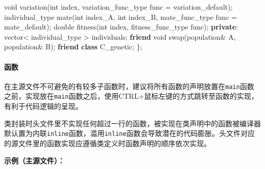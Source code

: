 \documentclass[
]{article}
\newenvironment{Shaded}{}{}
\newcommand{\DataTypeTok}[1]{\textcolor[rgb]{0.56,0.13,0.00}{#1}}
\newcommand{\KeywordTok}[1]{\textcolor[rgb]{0.00,0.44,0.13}{\textbf{#1}}}
\newcommand{\NormalTok}[1]{#1}
\newcommand{\OperatorTok}[1]{\textcolor[rgb]{0.40,0.40,0.40}{#1}}
\begin{document}
\begin{Shaded}
\begin{Highlighting}[]
	\DataTypeTok{void}\NormalTok{ variation}\OperatorTok{(}\DataTypeTok{int}\NormalTok{ index}\OperatorTok{,} \DataTypeTok{variation\_func\_type}\NormalTok{ func }\OperatorTok{=}\NormalTok{ variation\_default}\OperatorTok{);}
	\DataTypeTok{individual\_type}\NormalTok{ mate}\OperatorTok{(}\DataTypeTok{int}\NormalTok{ index\_A}\OperatorTok{,} \DataTypeTok{int}\NormalTok{ index\_B}\OperatorTok{,} \DataTypeTok{mate\_func\_type}\NormalTok{ func }\OperatorTok{=}\NormalTok{ mate\_default}\OperatorTok{);}
	\DataTypeTok{double}\NormalTok{ fitness}\OperatorTok{(}\DataTypeTok{int}\NormalTok{ index}\OperatorTok{,} \DataTypeTok{fitness\_func\_type}\NormalTok{ func}\OperatorTok{);}
\KeywordTok{private}\OperatorTok{:}
\NormalTok{	vector}\OperatorTok{\textless{}} \DataTypeTok{individual\_type} \OperatorTok{\textgreater{}}\NormalTok{ individuals}\OperatorTok{;}
	\KeywordTok{friend} \DataTypeTok{void}\NormalTok{ swap}\OperatorTok{(}\NormalTok{population}\OperatorTok{\&}\NormalTok{ A}\OperatorTok{,}\NormalTok{ population}\OperatorTok{\&}\NormalTok{ B}\OperatorTok{);}
	\KeywordTok{friend} \KeywordTok{class}\NormalTok{ C\_genetic}\OperatorTok{;}
\OperatorTok{\};}
\end{Highlighting}
\end{Shaded}

\hypertarget{ux51fdux6570}{%
\paragraph{函数}\label{ux51fdux6570}}

在主源文件不可避免的有较多子函数时，建议将所有函数的声明放置在\texttt{main}函数之前，实现放在\texttt{main}函数之后，使用CTRL+鼠标左键的方式跳转至函数的实现，有利于代码逻辑的呈现。

类封装时头文件里不实现任何超过一行的函数，被实现在类声明中的函数被编译器默认置为内联\texttt{inline}函数，滥用\texttt{inline}函数会导致潜在的代码膨胀。头文件对应的源文件里的函数实现应遵循类定义时函数声明的顺序依次实现。

\textbf{示例（主源文件）：}
\end{document}
